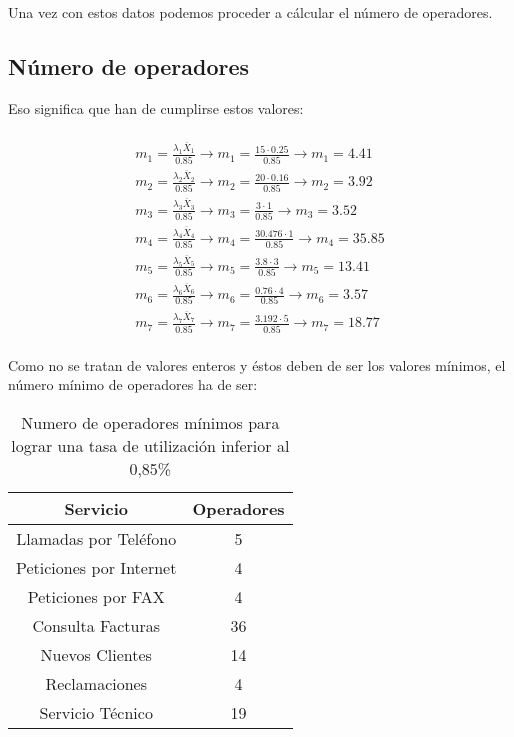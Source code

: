 Una vez con estos datos podemos proceder a cálcular el número de operadores.

\subsection{Número de operadores}
Eso significa que han de cumplirse estos valores:

\begin{multline}\\
  m_{1} = \frac{\lambda_{1}\overline{X}_{1}}{0.85} \rightarrow m_{1} = \frac{15\cdot 0.25}{0.85} \rightarrow m_{1} = 4.41 \\
  m_{2} = \frac{\lambda_{2}\overline{X}_{2}}{0.85} \rightarrow m_{2} = \frac{20\cdot 0.16}{0.85} \rightarrow m_{2} = 3.92\\
  m_{3} = \frac{\lambda_{3}\overline{X}_{3}}{0.85} \rightarrow m_{3} = \frac{3\cdot 1}{0.85} \rightarrow m_{3} = 3.52\\
  m_{4} = \frac{\lambda_{4}\overline{X}_{4}}{0.85} \rightarrow m_{4} = \frac{30.476\cdot 1}{0.85} \rightarrow m_{4} = 35.85\\
  m_{5} = \frac{\lambda_{5}\overline{X}_{5}}{0.85} \rightarrow m_{5} = \frac{3.8\cdot 3}{0.85} \rightarrow m_{5} = 13.41\\
  m_{6} = \frac{\lambda_{6}\overline{X}_{6}}{0.85} \rightarrow m_{6} = \frac{0.76\cdot 4}{0.85} \rightarrow m_{6} = 3.57\\
  m_{7} = \frac{\lambda_{7}\overline{X}_{7}}{0.85} \rightarrow m_{7} = \frac{3.192\cdot 5}{0.85} \rightarrow m_{7} = 18.77\\
\end{multline}

Como no se tratan de valores enteros y éstos deben de ser los valores mínimos, el número mínimo de operadores ha de ser:

\begin{table}[H]
  \begin{center}
  \begin{tabular}{|c|c|}
    \hline
    \textbf{Servicio}       & \textbf{Operadores} \\ \hline
    Llamadas por Teléfono   & 5                   \\ \hline
    Peticiones por Internet & 4                   \\ \hline
    Peticiones por FAX      & 4                   \\ \hline
    Consulta Facturas      & 36                   \\ \hline
    Nuevos Clientes      & 14                   \\ \hline
    Reclamaciones      & 4                   \\ \hline
    Servicio Técnico      & 19                   \\ \hline
  \end{tabular}
\end{center}
  \caption{Numero de operadores mínimos para lograr una tasa de utilización inferior al 0,85\%}
\end{table}
